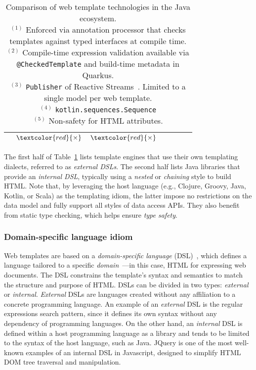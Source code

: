 \begin{table}[h]
\begin{tabular}{|c|c|c|c|c|c|c|}
     & \large{$\textcolor{red}{\times}$}
     & \large{$\textcolor{red}{\times}$}
    \\
    \hline
  \end{tabular}
  \caption{
    Comparison of web template technologies in the Java ecosystem.
    \\$^{(1)}$ Enforced via annotation processor that checks templates against typed interfaces at compile time.
    \\$^{(2)}$ Compile-time expression validation available via \texttt{@CheckedTemplate} and build-time metadata in Quarkus.
    \\$^{(3)}$ \texttt{Publisher} of Reactive Streams~\cite{ReactiveStreams}. Limited to a single model per web template.
    \\$^{(4)}$ \texttt{kotlin.sequences.Sequence}
    \\$^{(5)}$ Non-safety for HTML attributes.
  }
  \label{table:cmplibs}
\end{table}

The first half of Table~\ref{table:cmplibs} lists template engines that use
their own templating dialects, referred to as \textit{external DSLs}. The
second half lists Java libraries that provide an \textit{internal DSL},
typically using a \textit{nested} or \textit{chaining} style to build HTML.
Note that, by leveraging the host language (e.g., Clojure, Groovy, Java,
Kotlin, or Scala) as the templating idiom, the latter impose no restrictions on
the data model and fully support all styles of data access APIs. They also
benefit from static type checking, which helps ensure \textit{type safety}.


\subsubsection{Domain-specific language idiom}

Web templates are based on a \textit{domain-specific language}
(DSL)~\cite{landin1966next}, which defines a language tailored to a specific
\textit{domain}~\cite{evans2004domain}—in this case, HTML for expressing web
documents. The DSL constrains the template's syntax and semantics to match the
structure and purpose of HTML.
DSLs can be divided in two types: \textit{external} or
\textit{internal}\cite{dslbook}. \textit{External} DSLs are languages created
without any affiliation to a concrete programming language. An example of an
\textit{external} DSL is the regular expressions search
pattern\cite{thompson1968}, since it defines its own syntax without any
dependency of programming languages. On the other hand, an \textit{internal} DSL
is defined within a host programming language as a library and tends to be
limited to the syntax of the host language, such as Java.
JQuery\cite{resig2007pro} is one of the most well-known examples of an internal
DSL in Javascript, designed to simplify HTML DOM\cite{dom} tree traversal and
manipulation.

